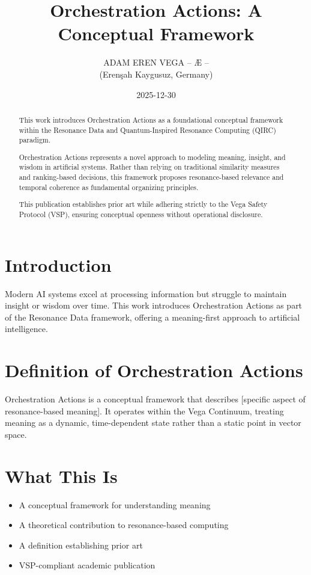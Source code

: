 \documentclass[12pt,a4paper]{article}
\title{Orchestration Actions: A Conceptual Framework}
\author{ADAM EREN VEGA – Æ –\\
\small (Erenşah Kaygusuz, Germany)}
\date{2025-12-30}
\begin{document}
\maketitle

\begin{abstract}
This work introduces Orchestration Actions as a foundational conceptual framework within the Resonance Data and Quantum-Inspired Resonance Computing (QIRC) paradigm.

Orchestration Actions represents a novel approach to modeling meaning, insight, and wisdom in artificial systems. Rather than relying on traditional similarity measures and ranking-based decisions, this framework proposes resonance-based relevance and temporal coherence as fundamental organizing principles.

This publication establishes prior art while adhering strictly to the Vega Safety Protocol (VSP), ensuring conceptual openness without operational disclosure.
\end{abstract}

\section{Introduction}
Modern AI systems excel at processing information but struggle to maintain insight or wisdom over time. 
This work introduces Orchestration Actions as part of the Resonance Data framework, offering a meaning-first approach 
to artificial intelligence.

\section{Definition of Orchestration Actions}
Orchestration Actions is a conceptual framework that describes [specific aspect of resonance-based meaning].
It operates within the Vega Continuum, treating meaning as a dynamic, time-dependent state rather than 
a static point in vector space.

\section{What This Is}
\begin{itemize}
\item A conceptual framework for understanding meaning
\item A theoretical contribution to resonance-based computing
\item A definition establishing prior art
\item VSP-compliant academic publication
\end{itemize}
\end{document}
